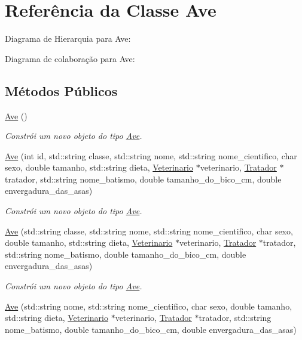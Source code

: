 \hypertarget{classAve}{}\section{Referência da Classe Ave}
\label{classAve}


Diagrama de Hierarquia para Ave\+:


Diagrama de colaboração para Ave\+:
\subsection*{Métodos Públicos}
\begin{DoxyCompactItemize}
\item 
\mbox{\label{classAve_a31bc97c3258df566381300c8b9abc73a}} 
\hyperlink{classAve_a31bc97c3258df566381300c8b9abc73a}{Ave} ()
\begin{DoxyCompactList}\small\item\em Constrói um novo objeto do tipo \hyperlink{classAve}{Ave}. \end{DoxyCompactList}\item 
\hyperlink{classAve_aa1a19a4a964c41107df2886261f055e8}{Ave} (int id, std\+::string classe, std\+::string nome, std\+::string nome\+\_\+cientifico, char sexo, double tamanho, std\+::string dieta, \hyperlink{classVeterinario}{Veterinario} $\ast$veterinario, \hyperlink{classTratador}{Tratador} $\ast$tratador, std\+::string nome\+\_\+batismo, double tamanho\+\_\+do\+\_\+bico\+\_\+cm, double envergadura\+\_\+das\+\_\+asas)
\begin{DoxyCompactList}\small\item\em Constrói um novo objeto do tipo \hyperlink{classAve}{Ave}. \end{DoxyCompactList}\item 
\hyperlink{classAve_a5bd72e6267c5159c50dc2ef89fa8e377}{Ave} (std\+::string classe, std\+::string nome, std\+::string nome\+\_\+cientifico, char sexo, double tamanho, std\+::string dieta, \hyperlink{classVeterinario}{Veterinario} $\ast$veterinario, \hyperlink{classTratador}{Tratador} $\ast$tratador, std\+::string nome\+\_\+batismo, double tamanho\+\_\+do\+\_\+bico\+\_\+cm, double envergadura\+\_\+das\+\_\+asas)
\begin{DoxyCompactList}\small\item\em Constrói um novo objeto do tipo \hyperlink{classAve}{Ave}. \end{DoxyCompactList}\item 
\hyperlink{classAve_a29d8dd03ea436b1d63399ade9f9107b9}{Ave} (std\+::string nome, std\+::string nome\+\_\+cientifico, char sexo, double tamanho, std\+::string dieta, \hyperlink{classVeterinario}{Veterinario} $\ast$veterinario, \hyperlink{classTratador}{Tratador} $\ast$tratador, std\+::string nome\+\_\+batismo, double tamanho\+\_\+do\+\_\+bico\+\_\+cm, double envergadura\+\_\+das\+\_\+asas)

\end{DoxyCompactItemize}
